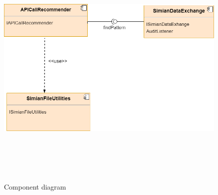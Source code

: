 \begin{figure}[!h]
\includegraphics[width=12cm,height=12cm,keepaspectratio]{images/Component.png}
\centering
\caption{Component diagram}
\label{fig:cmd}
\end{figure}

